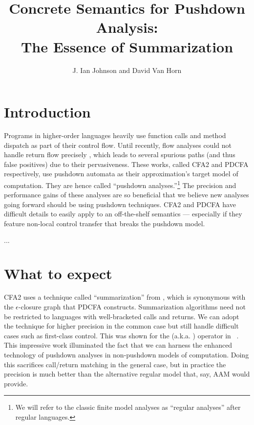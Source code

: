 \documentclass{llncs}
\title{Concrete Semantics for Pushdown Analysis:\\The Essence of Summarization}
\author{J. Ian Johnson and David Van Horn}
\institute{Northeastern University \\
           \email{\{ianj,dvanhorn\}@ccs.neu.edu}}
\newcommand{\Scribtexttt}[1]{{\texttt{#1}}}
\newcommand{\SColorize}[2]{\color{#1}{#2}}
\newcommand{\inColor}[2]{{\Scribtexttt{\SColorize{#1}{#2}}}}
\newcommand{\rackett}[1]{\inColor{black}{#1}}
\begin{document}
\maketitle


\section{Introduction}

Programs in higher-order languages heavily use function calls and
method dispatch as part of their control flow. Until recently, flow
analyses could not handle return flow precisely
\citep{ianjohnson:vardoulakis-lmcs11, ianjohnson:earl2010pdcfa}, which
leads to several spurious paths (and thus false positives) due to
their pervasiveness. These works, called CFA2 and PDCFA respectively,
use pushdown automata as their approximation's target model of
computation. They are hence called ``pushdown analyses.''\footnote{We
  will refer to the classic finite model analyses as ``regular
  analyses'' after regular languages.} The precision and performance
gains of these analyses are so beneficial that we believe new analyses
going forward should be using pushdown techniques. CFA2 and PDCFA have
difficult details to easily apply to an off-the-shelf semantics ---
especially if they feature non-local control transfer that breaks the
pushdown model. 

...


\section{What to expect}

CFA2 uses a technique called ``summarization'' from
\citet[Chapter 7]{local:muchnick:jones:flow-analysis:1981}, which is synonymous with the
$\epsilon$-closure graph that PDCFA constructs. Summarization
algorithms need not be restricted to languages with well-bracketed
calls and returns. We can adopt the technique for higher precision in
the common case but still handle difficult cases such as first-class
control. This was shown for the
\rackett{call-with-current-continuation} (a.k.a. \rackett{call/cc})
operator in ~\citet{ianjohnson:Vardoulakis2011Pushdown}. This
impressive work illuminated the fact that we can harness the enhanced
technology of pushdown analyses in non-pushdown models of
computation. Doing this sacrifices call/return matching in the general
case, but in practice the precision is much better than the
alternative regular model that, say, AAM would provide.
\end{document}
